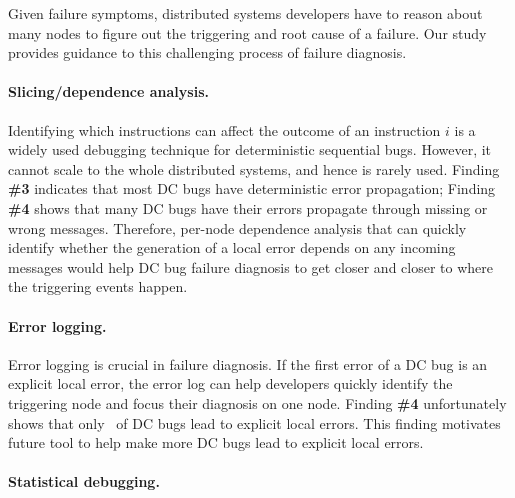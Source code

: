 Given failure symptoms, distributed systems developers have to reason 
about many nodes to figure out the triggering and root cause of 
a failure.
Our study provides guidance to this challenging process of
failure diagnosis.

\paragraph{Slicing/dependence analysis.} 

Identifying which instructions can affect the outcome of an
instruction $i$ is a widely used debugging technique for deterministic
sequential bugs.  However, it cannot scale to the whole distributed
systems, and hence is rarely used.
%
%
Finding {\bf \#3} indicates that most DC bugs have deterministic error
propagation; Finding {\bf \#4} shows that many DC bugs have their
errors propagate through missing or
wrong messages.  Therefore, per-node dependence analysis that can
quickly identify whether the generation of a local error depends on
any incoming messages would help DC bug failure diagnosis to get
closer and closer to where the triggering events happen.




\paragraph{Error logging.}  

Error logging is crucial in failure diagnosis. If the
first error of a DC bug is an explicit local error, the error log can
help developers quickly identify the triggering node and focus their
diagnosis on one node.
%
%
Finding {\bf \#4} unfortunately shows that only \pctErrLocExp\ of DC bugs
lead to explicit local errors. This finding motivates future
tool to help make more DC bugs lead to explicit local errors.


\paragraph{Statistical debugging.}

